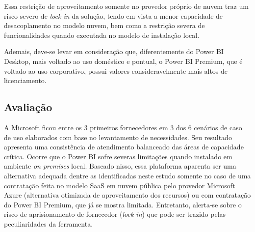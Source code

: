 Essa restrição de aproveitamento somente no provedor próprio de nuvem traz um risco severo de \emph{lock in} da solução, tendo em vista a menor capacidade de desacoplamento no modelo nuvem, bem como a restrição severa de funcionalidades quando executada no modelo de instalação local.

Ademais, deve-se levar em consideração que, diferentemente do Power BI Desktop, mais voltado ao uso doméstico e pontual, o Power BI Premium, que é voltado ao uso corporativo, possui valores consideravelmente mais altos de licenciamento.

\subsection*{Avaliação}

A Microsoft ficou entre os 3 primeiros fornecedores em 3 dos 6 cenários de caso de uso elaborados com base no levantamento de necessidades. Seu resultado apresenta uma consistência de atendimento balanceado das áreas de capacidade crítica. Ocorre que o Power BI sofre severas limitações quando instalado em ambiente \emph{on premises} local. Baseado nisso, essa plataforma aparenta ser uma  alternativa adequada dentre as identificadas neste estudo somente no caso de uma contratação feita no modelo \hyperref[saas]{SaaS} em nuvem pública pelo provedor Microsoft Azure (alternativa otimizada de aproveitamento dos recursos) ou com contratação do Power BI Premium, que já se mostra limitada. Entretanto, alerta-se sobre o risco de aprisionamento de fornecedor (\emph{lock in}) que pode ser trazido pelas peculiaridades da ferramenta.